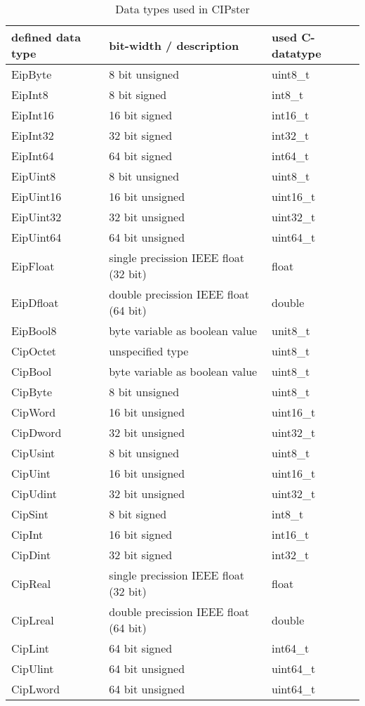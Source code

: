 \documentclass[final,a4paper,10pt, oneside]{article}
\begin{document}
\begin{table}[h]
\caption{Data types used in CIPster} \label{tab:datatypes}
    \centering
        \begin{tabular}{lll}
            defined data type	& bit-width / description & used C-datatype \\
            \hline
            EipByte	&	8 bit unsigned	&   uint8\_t\\
            EipInt8	&	8 bit signed	&	int8\_t	 \\
            EipInt16	&	16 bit signed	&	int16\_t	 \\
            EipInt32	&	32 bit signed	&	int32\_t	 \\
            EipInt64 & 64 bit signed & int64\_t \\
            EipUint8	&	8 bit unsigned	&	uint8\_t	 \\
            EipUint16	&	16 bit unsigned	&	uint16\_t	 \\
            EipUint32	&	32 bit unsigned	&	uint32\_t	 \\
            EipUint64 & 64 bit unsigned & uint64\_t \\
            EipFloat	&	single precission IEEE float (32 bit) &	float	 \\
            EipDfloat	&	double precission IEEE float (64 bit) &	double	\\
            EipBool8	&	byte variable as boolean value	&	unit8\_t	 \\

            CipOctet & unspecified type & uint8\_t \\
            CipBool & byte variable as boolean value & uint8\_t \\
            CipByte & 8 bit unsigned & uint8\_t \\
            CipWord & 16 bit unsigned & uint16\_t \\
            CipDword & 32 bit unsigned & uint32\_t \\
            CipUsint & 8 bit unsigned & uint8\_t \\
            CipUint & 16 bit unsigned & uint16\_t \\
            CipUdint & 32 bit unsigned & uint32\_t \\
            CipSint & 8 bit signed & int8\_t \\
            CipInt & 16 bit signed & int16\_t \\
            CipDint & 32 bit signed & int32\_t \\
            CipReal & single precission IEEE float (32 bit) & float \\
            CipLreal & double precission IEEE float (64 bit) & double \\

            CipLint & 64 bit signed & int64\_t \\
            CipUlint & 64 bit unsigned & uint64\_t \\
            CipLword & 64 bit unsigned & uint64\_t
        \end{tabular}
\end{table}
\end{document}

